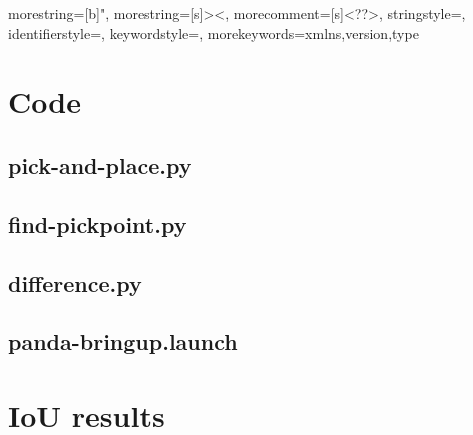 


{
  morestring=[b]",
  morestring=[s]{>}{<},
  morecomment=[s]{<?}{?>},
  stringstyle=\color{black},
  identifierstyle=\color{darkblue},
  keywordstyle=\color{cyan},
  morekeywords={xmlns,version,type}%
}
\appendix



\chapter{Code}
\section{pick-and-place.py}\label{sec:pickandplace}
%
\pagebreak
\section{find-pickpoint.py}\label{sec:findpickpoint}
%
\pagebreak
\section{difference.py}\label{sec:difference}
%
\pagebreak
\section{panda-bringup.launch}\label{sec:pandabringup}


\chapter{IoU results}\label{sec:IoUresults}